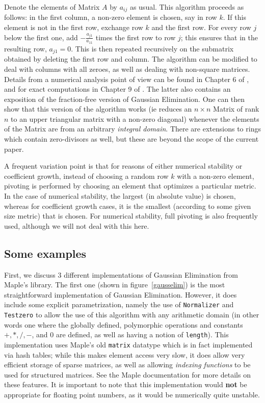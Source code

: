 \documentclass[11pt]{elsart}
\begin{document}
Denote the elements of Matrix $A$ by $a_{ij}$ as usual.
This algorithm proceeds as follows: in the first column, a non-zero element
is chosen, say in row $k$.  If this element is not in the first row, 
exchange row $k$ and the first row.  For every row $j$ below the first one,
add $-\frac{a_{j1}}{a_{11}}$ times the first row to row $j$; this ensures 
that in the resulting row, $a_{j1}=0$.  This is then repeated recursively
on the submatrix obtained by deleting the first row and column.  The
algorithm can be modified to deal with columns with all zeroes, as well as
dealing with non-square matrices.  Details from a numerical analysis point
of view can be found in Chapter 6 of \cite{BurdenFaires}, and for
exact computations in Chapter 9 of \cite{Geddes:1992:ACA}.  The
latter also contains an exposition of the fraction-free version of 
Gaussian Elimination.  One can then show that this version of the 
algorithm works
(ie reduces an $n\times n$ Matrix of rank $n$ to an upper triangular
matrix with a non-zero diagonal) whenever the elements of the Matrix
are from an arbitrary \emph{integral domain}.  There are extensions to
rings which contain zero-divisors as well, but these are beyond the scope
of the current paper.

A frequent variation point is that for reasons of either numerical stability
or coefficient growth, instead of choosing a random row $k$ with a non-zero
element, pivoting is performed by choosing an element that optimizes
a particular metric.  In the case of numerical stability, the largest (in
absolute value) is chosen, whereas for coefficient growth cases, it is 
the smallest (according to some given size metric) that is chosen.  For
numerical stability, full pivoting is also frequently used, although
we will not deal with this here.

\subsection{Some examples}

First, we discuss 3 different implementations of Gaussian Elimination
from Maple's library.  The first one (shown in figure~\ref{gausselim}) 
is the most
straightforward implementation of Gaussian Elimination.  However, it
does include some explicit parametrization, namely the use of
\texttt{Normalizer} and \texttt{Testzero} to allow the use of this
algorithm with any arithmetic domain (in other words one where
the globally defined, polymorphic operations and constants
$+, *, \slash, -$, and $0$ are defined, as well as having a notion of
\texttt{length}).  This implementation  uses Maple's old \texttt{matrix} 
datatype which is in fact implemented via hash tables; while this makes
element access very slow, it does allow very efficient storage of 
sparse matrices, as well as allowing \emph{indexing functions} to be
used for structured matrices.  See the Maple documentation
\cite{Monagan:2001:M7P} for more details on these features.  It is important
to note that this implementation would \textbf{not} be appropriate for 
floating point numbers, as it would be numerically quite unstable.
\end{document}

